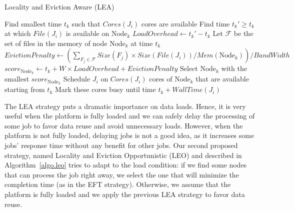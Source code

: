 \documentclass[conference,10pt]{IEEEtran}
\newcommand{\Node}[1]{\ensuremath{\mathrm{Node}_{#1}}\xspace}
\newcommand{\file}{\ensuremath{\mathit{File}}\xspace}
\newcommand{\size}{\ensuremath{\mathit{Size}}\xspace}
\newcommand{\memory}{\ensuremath{\mathit{Mem}}\xspace}
\newcommand{\bandwidth}{\mathit{BandWidth}\xspace}
\newcommand{\core}{\mathit{Cores}\xspace}
\newcommand{\walltime}{\mathit{WallTime}\xspace}
\newcommand{\nodeset}{\ensuremath{\mathbb{N}}\xspace}
\begin{document}
\begin{algorithm*}[htb]%
\caption{Locality and Eviction Aware (LEA)}\label{algo.lea}
\begin{algorithmic}[1]
		\ForEach{$\Node{k} \in \nodeset$}
			\State Find smallest time $t_k$ such that $\core(J_i)$ cores are available
			\State Find time $t_k'\geq t_k$ at which $\file(J_i)$ is available on $\Node{k}$
			\State $\mathit{LoadOverhead} \gets t_k' - t_k$ %
                        \State Let $\mathcal{F}$ be the set of files in the memory of node \Node{k} at time $t_k$
			\State $\mathit{EvictionPenalty} \gets (\sum_{F_j\in\mathcal{F}}\size(F_j) \times \size(\file(J_i))/\memory(\Node{k}))/\bandwidth$
			\State $score_{\Node{k}} \gets t_k + W \times \mathit{LoadOverhead} + \mathit{EvictionPenalty}$
		\EndFor
                \State Select \Node{k} with the smallest $score_{\Node{k}}$
                \State Schedule $J_i$ on $\core(J_i)$ cores of \Node{k} that are available starting from $t_k$
                \State Mark these cores busy until time $t_k +\walltime(J_i)$
	\EndFor
\end{algorithmic}
\end{algorithm*}


The LEA strategy puts a dramatic importance on data loads. Hence, it
is very useful when the platform is fully loaded and we can safely
delay the processing of some job to favor data reuse and avoid
unnecessary loads. However, when the platform is not fully loaded,
delaying jobs is not a good idea, as it increases some jobs' response
time without any benefit for other jobs. Our second proposed strategy,
named Locality and Eviction Opportunistic (LEO) and described in Algorithm~\ref{algo.leo} tries to adapt to
the load condition: if we find some nodes that can process the job
right away, we select the one that will minimize the completion time
(as in the EFT strategy). Otherwise, we assume that the platform is
fully loaded and we apply the previous LEA strategy to favor data reuse.
\end{document}
